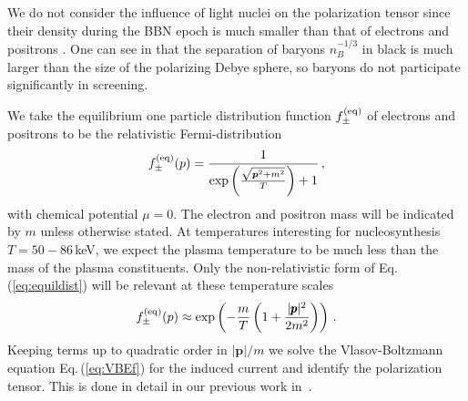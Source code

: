 We do not consider the influence of light nuclei on the polarization tensor since their density during the BBN epoch is much smaller than that of electrons and positrons . One can see in  that the separation of baryons $n_B^{-1/3}$ in black is much larger than the size of the polarizing Debye sphere, so baryons do not participate significantly in screening.

We take the equilibrium one particle distribution function $f_\pm^{(\mathrm{eq})}$ of electrons and positrons to be the relativistic Fermi-distribution
\begin{equation}\label{eq:equildist}
f^{(\mathrm{eq})}_\pm(p) = \frac{1}{\exp{\left(\frac{\sqrt{\boldsymbol{p}^2 + m^2}}{T}\right)}
+1}\,,
\end{equation}
with chemical potential $\mu = 0 $. The electron and positron mass will be indicated by $m$ unless otherwise stated. At temperatures interesting for nucleosynthesis $T = 50-86$\,keV, we expect the plasma temperature to be much less than the mass of the plasma constituents. Only the non-relativistic form of Eq.\,(\ref{eq:equildist}) will be relevant at these temperature scales
\begin{equation}
f^{(\mathrm{eq})}_\pm(p) \approx \exp\left(- \frac{m}{T}\left(1+\frac{|\pmb{p}|^2}{2m^2}\right)\right)\,.
\end{equation}
Keeping terms up to quadratic order in $|\boldsymbol{p}|/m$ we solve the Vlasov-Boltzmann equation Eq.\,(\ref{eq:VBEf}) for the induced current and identify the polarization tensor. This is done in detail in our previous work in~\cite{Formanek:2021blc}.

